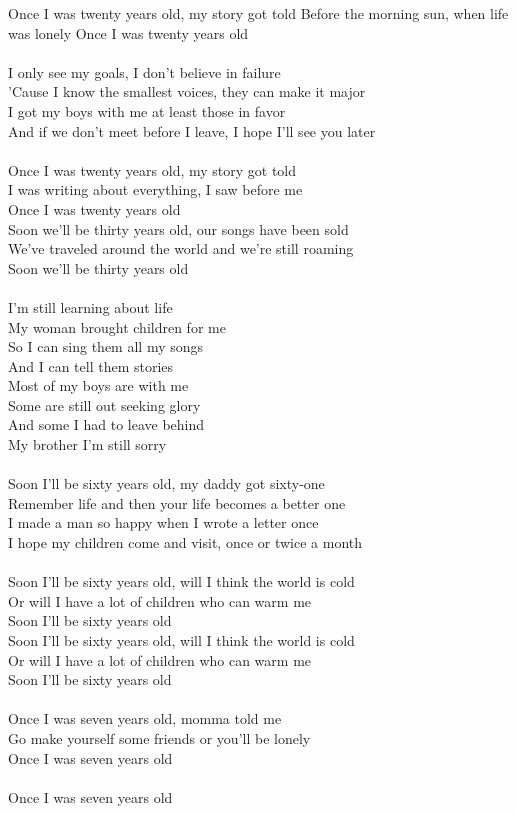 \documentclass{article}
\begin{document}
Once I was twenty years old, my story got told
Before the morning sun, when life was lonely
Once I was twenty years old\\
\\
I only see my goals, I don't believe in failure\\
'Cause I know the smallest voices, they can make it major\\
I got my boys with me at least those in favor\\
And if we don't meet before I leave, I hope I'll see you later\\
\\
Once I was twenty years old, my story got told\\
I was writing about everything, I saw before me\\
Once I was twenty years old\\
Soon we'll be thirty years old, our songs have been sold\\
We've traveled around the world and we're still roaming\\
Soon we'll be thirty years old\\
\\
I'm still learning about life\\
My woman brought children for me\\
So I can sing them all my songs\\
And I can tell them stories\\
Most of my boys are with me\\
Some are still out seeking glory\\
And some I had to leave behind\\
My brother I'm still sorry\\
\\
Soon I'll be sixty years old, my daddy got sixty-one\\
Remember life and then your life becomes a better one\\
I made a man so happy when I wrote a letter once\\
I hope my children come and visit, once or twice a month\\
\\
Soon I'll be sixty years old, will I think the world is cold\\
Or will I have a lot of children who can warm me\\
Soon I'll be sixty years old\\
Soon I'll be sixty years old, will I think the world is cold\\
Or will I have a lot of children who can warm me\\
Soon I'll be sixty years old\\
\\
Once I was seven years old, momma told me\\
Go make yourself some friends or you'll be lonely\\
Once I was seven years old\\
\\
Once I was seven years old\\
\end{document}
